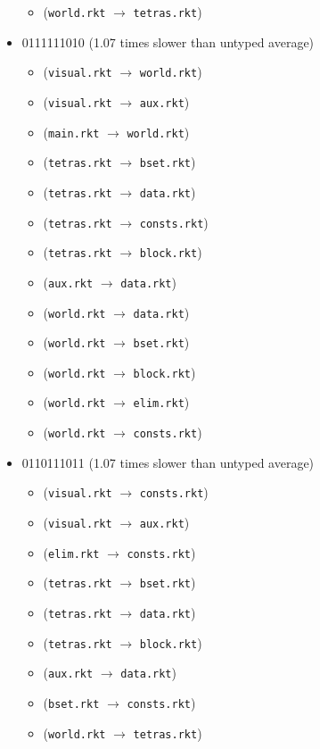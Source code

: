 \documentclass{article}
\newcommand{\mono}[1]{\texttt{#1}}
\begin{document}
\begin{itemize}
\begin{itemize}
  \item (\mono{world.rkt} $\rightarrow$ \mono{tetras.rkt})
  \end{itemize}
\item 0111111010 (1.07 times slower than untyped average)
  \begin{itemize}
  \item (\mono{visual.rkt} $\rightarrow$ \mono{world.rkt})
  \item (\mono{visual.rkt} $\rightarrow$ \mono{aux.rkt})
  \item (\mono{main.rkt} $\rightarrow$ \mono{world.rkt})
  \item (\mono{tetras.rkt} $\rightarrow$ \mono{bset.rkt})
  \item (\mono{tetras.rkt} $\rightarrow$ \mono{data.rkt})
  \item (\mono{tetras.rkt} $\rightarrow$ \mono{consts.rkt})
  \item (\mono{tetras.rkt} $\rightarrow$ \mono{block.rkt})
  \item (\mono{aux.rkt} $\rightarrow$ \mono{data.rkt})
  \item (\mono{world.rkt} $\rightarrow$ \mono{data.rkt})
  \item (\mono{world.rkt} $\rightarrow$ \mono{bset.rkt})
  \item (\mono{world.rkt} $\rightarrow$ \mono{block.rkt})
  \item (\mono{world.rkt} $\rightarrow$ \mono{elim.rkt})
  \item (\mono{world.rkt} $\rightarrow$ \mono{consts.rkt})
  \end{itemize}
\item 0110111011 (1.07 times slower than untyped average)
  \begin{itemize}
  \item (\mono{visual.rkt} $\rightarrow$ \mono{consts.rkt})
  \item (\mono{visual.rkt} $\rightarrow$ \mono{aux.rkt})
  \item (\mono{elim.rkt} $\rightarrow$ \mono{consts.rkt})
  \item (\mono{tetras.rkt} $\rightarrow$ \mono{bset.rkt})
  \item (\mono{tetras.rkt} $\rightarrow$ \mono{data.rkt})
  \item (\mono{tetras.rkt} $\rightarrow$ \mono{block.rkt})
  \item (\mono{aux.rkt} $\rightarrow$ \mono{data.rkt})
  \item (\mono{bset.rkt} $\rightarrow$ \mono{consts.rkt})
  \item (\mono{world.rkt} $\rightarrow$ \mono{tetras.rkt})

\end{itemize}
\end{itemize}
\end{document}
